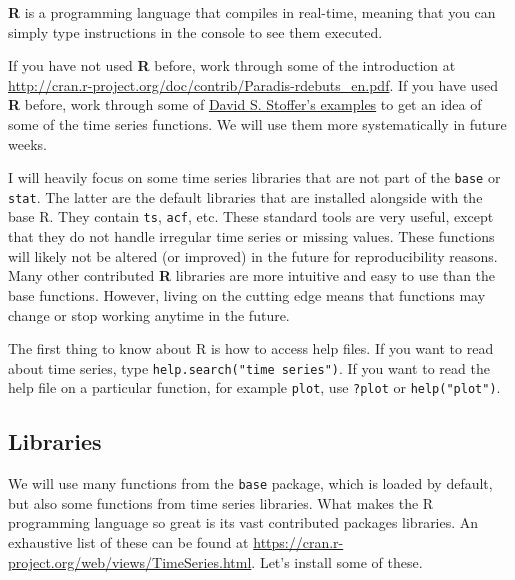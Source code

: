 \documentclass[]{book}
\begin{document}
\textbf{R} is a programming language that compiles in real-time, meaning
that you can simply type instructions in the console to see them
executed.

If you have not used \textbf{R} before, work through some of the
introduction at
\url{http://cran.r-project.org/doc/contrib/Paradis-rdebuts_en.pdf}. If
you have used \textbf{R} before, work through some of
\href{http://www.stat.pitt.edu/stoffer/tsa4/}{David S. Stoffer's
examples} to get an idea of some of the time series functions. We will
use them more systematically in future weeks.

I will heavily focus on some time series libraries that are not part of
the \texttt{base} or \texttt{stat}. The latter are the default libraries
that are installed alongside with the base R. They contain \texttt{ts},
\texttt{acf}, etc. These standard tools are very useful, except that
they do not handle irregular time series or missing values. These
functions will likely not be altered (or improved) in the future for
reproducibility reasons. Many other contributed \textbf{R} libraries are
more intuitive and easy to use than the base functions. However, living
on the cutting edge means that functions may change or stop working
anytime in the future.

The first thing to know about R is how to access help files. If you want
to read about time series, type \texttt{help.search("time\ series")}. If
you want to read the help file on a particular function, for example
\texttt{plot}, use \texttt{?plot} or \texttt{help("plot")}.

\subsection{Libraries}\label{libraries}

We will use many functions from the \texttt{base} package, which is
loaded by default, but also some functions from time series libraries.
What makes the R programming language so great is its vast contributed
packages libraries. An exhaustive list of these can be found at
\url{https://cran.r-project.org/web/views/TimeSeries.html}. Let's
install some of these.
\end{document}
